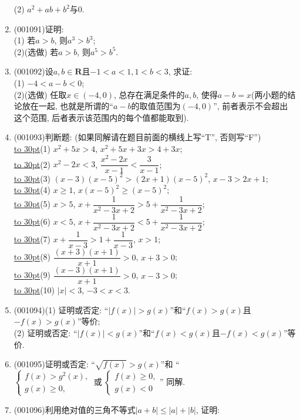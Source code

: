 \documentclass[10pt,a4paper]{article}
\newcommand{\blank}[1]{\underline{\hbox to #1pt{}}}
\begin{document}
\begin{enumerate}[1.]
(2) $a^2+ab+b^2$与$0$.
\item {\tiny (001091)}证明:\\ 
(1) 若$a>b$, 则$a^3>b^3$;\\ 
(2)(选做) 若$a>b$, 则$a^5>b^5$.
\item {\tiny (001092)}设$a,b\in\mathbf{R}$且$-1<a<1,1<b<3$, 求证:\\ 
(1) $-4<a-b<0$;\\ 
(2)(选做) 任取$x\in(-4,0)$, 总存在满足条件的$a,b$, 使得$a-b=x$(两小题的结论放在一起, 也就是所谓的``$a-b$的取值范围为$(-4,0)$'', 前者表示不会超出这个范围, 后者表示该范围内的每个值都能取到).
\item {\tiny (001093)}判断题: (如果同解请在题目前面的横线上写``T'', 否则写``F'')\\ 
\blank{30}(1) $x^2+5x>4$, $x^2+5x+3x>4+3x$;\\ 
\blank{30}(2) $x^2-2x<3$, $\dfrac{x^2-2x}{x-1}<\dfrac{3}{x-1}$;\\ 
\blank{30}(3) $(x-3)(x-5)^2>(2x+1)(x-5)^2$, $x-3>2x+1$;\\ 
\blank{30}(4) $x\ge 1$, $x(x-5)^2\ge (x-5)^2$;\\ 
\blank{30}(5) $x>5$, $x+\dfrac{1}{x^2-3x+2}> 5+\dfrac{1}{x^2-3x+2}$;\\ 
\blank{30}(6) $x<5$, $x+\dfrac{1}{x^2-3x+2}< 5+\dfrac{1}{x^2-3x+2}$;\\ 
\blank{30}(7) $x+\dfrac{1}{x-3}>1+\dfrac{1}{x-3}$, $x>1$;\\ 
\blank{30}(8) $\dfrac{(x+3)(x+1)}{x+1}>0$, $x+3>0$;\\ 
\blank{30}(9) $\dfrac{(x-3)(x+1)}{x+1}>0$, $x-3>0$;\\ 
\blank{30}(10) $|x|<3$, $-3<x<3$.
\item {\tiny (001094)}(1) 证明或否定: ``$|f(x)|>g(x)$''和``$f(x)>g(x)$且$-f(x)>g(x)$''等价;\\ 
(2) 证明或否定: ``$|f(x)|<g(x)$''和``$f(x)<g(x)$且$-f(x)<g(x)$''等价.
\item {\tiny (001095)}证明或否定: ``$\sqrt{f(x)}>g(x)$''和
``$\left\{\begin{array}{l}f(x)>g^2(x),\\g(x)\ge 0,\end{array}\right.\ \text{或} \ \left\{\begin{array}{l}f(x)\ge 0,\\g(x)<0\end{array}\right.$''
同解.
\item {\tiny (001096)}利用绝对值的三角不等式$|a+b|\le |a|+|b|$, 证明:\\ 

\end{enumerate}
\end{document}
